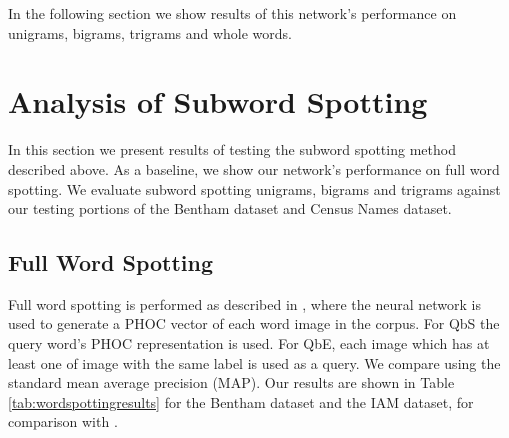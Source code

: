 \documentclass[ms,electronic,twosidetoc,letterpaper,chaptercenter,parttop,lol,lof,lot]{byumsphd}
\begin{document}
In the following section we show results of this network's performance on unigrams, bigrams, trigrams and whole words.


\section{Analysis of Subword Spotting}

In this section we present results of testing the subword spotting method described above.
As a baseline, we show our network's performance on full word spotting. We evaluate subword spotting unigrams, bigrams and trigrams against our testing portions of the Bentham dataset and Census Names dataset. 

\subsection{Full Word Spotting}

Full word spotting is performed as described in \cite{sudholt2016}, where the neural network is used to generate a PHOC vector of each word image in the corpus. For QbS the query word's PHOC representation is used. For QbE, each image which has at least one of image with the same label is used as a query. We compare using the standard mean average precision (MAP). Our results are shown in Table \ref{tab:wordspottingresults} for the Bentham dataset and the IAM dataset, for comparison with \cite{sudholt2016}.
\end{document}
